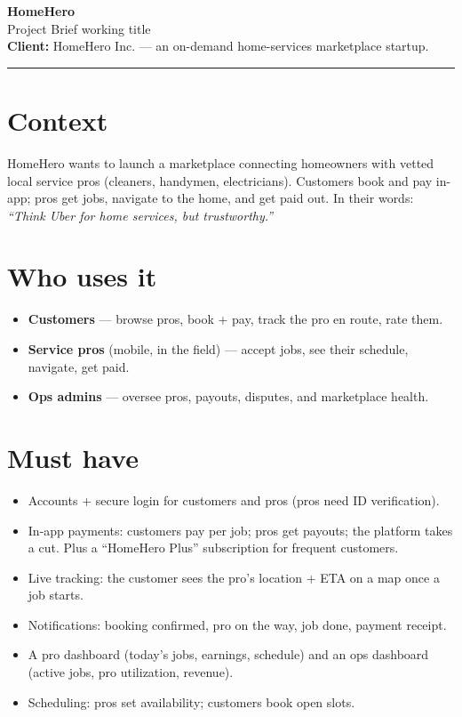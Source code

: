 \documentclass[11pt,a4paper]{article}
\begin{document}
{\Huge\bfseries HomeHero}\\[2pt]
{\large\color{soft} Project Brief \textemdash{} working title}\\[6pt]
{\color{soft}\textbf{Client:} HomeHero Inc. --- an on-demand home-services marketplace startup.}

\vspace{8pt}\hrule\vspace{10pt}

\section*{Context}
HomeHero wants to launch a marketplace connecting homeowners with vetted local service pros
(cleaners, handymen, electricians). Customers book and pay in-app; pros get jobs, navigate to the
home, and get paid out. In their words: \textit{``Think Uber for home services, but trustworthy.''}

\section*{Who uses it}
\begin{itemize}
  \item \textbf{Customers} --- browse pros, book + pay, track the pro en route, rate them.
  \item \textbf{Service pros} (mobile, in the field) --- accept jobs, see their schedule, navigate, get paid.
  \item \textbf{Ops admins} --- oversee pros, payouts, disputes, and marketplace health.
\end{itemize}

\section*{Must have}
\begin{itemize}
  \item Accounts + secure login for customers and pros (pros need ID verification).
  \item In-app payments: customers pay per job; pros get payouts; the platform takes a cut. Plus a
        ``HomeHero Plus'' subscription for frequent customers.
  \item Live tracking: the customer sees the pro's location + ETA on a map once a job starts.
  \item Notifications: booking confirmed, pro on the way, job done, payment receipt.
  \item A pro dashboard (today's jobs, earnings, schedule) and an ops dashboard (active jobs, pro
        utilization, revenue).
  \item Scheduling: pros set availability; customers book open slots.
\end{itemize}
\end{document}
